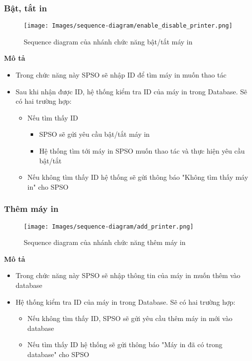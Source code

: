 \subsubsection{Bật, tắt in}
\begin{figure}[H]
    \centering
    \texttt{[image: Images/sequence-diagram/enable\_disable\_printer.png]}
    \newline
    \newline
    \caption{Sequence diagram của nhánh chức năng bật/tắt máy in}
    \label{fig:enter-label}
\end{figure}
\textbf{Mô tả}
\begin{itemize}
    \item Trong chức năng này SPSO sẽ nhập ID để tìm máy in muốn thao tác
    \item Sau khi nhận được ID, hệ thống kiểm tra ID của máy in trong Database. Sẽ có hai trường hợp:
    \begin{itemize}
        \item Nếu tìm thấy ID
        \begin{itemize}
            \item SPSO sẽ gửi yêu cầu bật/tắt máy in
            \item Hệ thống tìm tới máy in SPSO muốn thao tác và thực hiện yêu cầu bật/tắt
        \end{itemize}
        \item Nếu không tìm thấy ID hệ thống sẽ gửi thông báo "Không tìm thấy máy in" cho SPSO
    \end{itemize}
\end{itemize}

\subsubsection{Thêm máy in}
\begin{figure}[H]
    \centering
    \texttt{[image: Images/sequence-diagram/add\_printer.png]}
    \newline
    \newline
    \caption{Sequence diagram của nhánh chức năng thêm máy in}
    \label{fig:enter-label}
\end{figure}

\textbf{Mô tả}
\begin{itemize}
    \item Trong chức năng này SPSO sẽ nhập thông tin của máy in muốn thêm vào database
    \item Hệ thống kiểm tra ID của máy in trong Database. Sẽ có hai trường hợp:
    \begin{itemize}
        \item Nếu không tìm thấy ID, SPSO sẽ gửi yêu cầu thêm máy in mới vào database
        \item Nếu tìm thấy ID hệ thống sẽ gửi thông báo "Máy in đã có trong database" cho SPSO
    \end{itemize}
\end{itemize}

